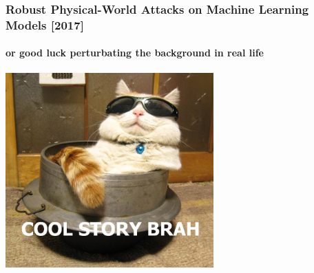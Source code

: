 \documentclass[9pt]{beamer}
\begin{document}
\begin{frame}
  \frametitle{Robust Physical-World Attacks on Machine Learning Models [2017]}

  \framesubtitle{or good luck perturbating the background in real life}

  \begin{center}
    \includegraphics[width = 8cm]{images/cool_story_bro_3.jpg}
  \end{center}

\end{frame}
\end{document}
